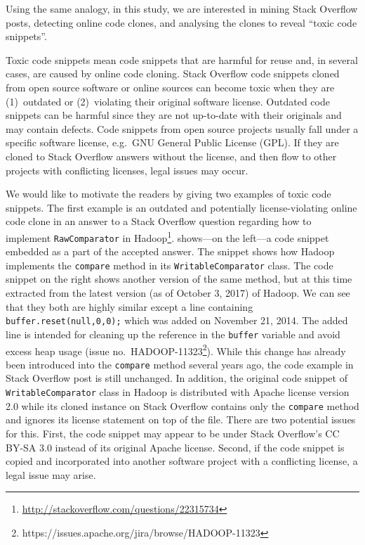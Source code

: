 \documentclass[10pt,journal,compsoc]{IEEEtran}
\begin{document}
Using the same analogy, in this study, we are interested in mining Stack
Overflow posts, detecting online code clones, and analysing the clones to reveal
``toxic code snippets''.

Toxic code snippets mean code snippets that are harmful for reuse and, in
several cases, are caused by online code cloning. Stack Overflow code snippets
cloned from open source software or online sources can become toxic when they
are (1)~outdated or (2)~violating their original software
license. Outdated code snippets
can be harmful since they are not up-to-date with their originals and may
contain defects. Code snippets from open source projects usually fall under a
specific software license, e.g.\ GNU General Public License (GPL). If they are
cloned to Stack Overflow answers without the license, and then flow to other projects
with conflicting licenses, legal issues may occur.

We would like to motivate the readers by giving two examples of toxic code
snippets. The first example is an outdated and potentially license-violating
online code clone in an answer to a Stack Overflow question regarding how to
implement {\small{\texttt{RawComparator}}} in
\textsf{Hadoop}\footnote{\url{http://stackoverflow.com/questions/22315734}}.
 shows---on the left---a code snippet embedded as a part
of the accepted answer. The snippet shows how \textsf{Hadoop} implements the
{\small{\texttt{compare}}} method in its {\small{\texttt{WritableComparator}}}
class. The code snippet on the right shows another version of the same method,
but at this time extracted from the latest version (as of October 3, 2017) of
\textsf{Hadoop}. We can see that they both are highly similar except a line
containing {\small{\verb|buffer.reset(null,0,0);|}} which was added on November
21, 2014. The added line is intended for cleaning up the reference in the
{\small{\verb|buffer|}} variable and avoid excess heap usage (issue
no.~HADOOP-11323\footnote{https://issues.apache.org/jira/browse/HADOOP-11323}).
While this change has already been introduced into the
{\small{\texttt{compare}}} method several years ago, the code example in Stack
Overflow post is still unchanged. %
In addition, the original code snippet of {\small\texttt{WritableComparator}}
class in Hadoop is distributed with Apache license version 2.0 while its cloned
instance on Stack Overflow contains only the {\small{\texttt{compare}}} method
and ignores its license statement on top of the file. There are two potential
issues for this. First, the code snippet may appear to be under Stack Overflow's
CC BY-SA 3.0 instead of its original Apache license. Second, if the code snippet
is copied and incorporated into another software project with a conflicting
license, a legal issue may arise.
\end{document}

